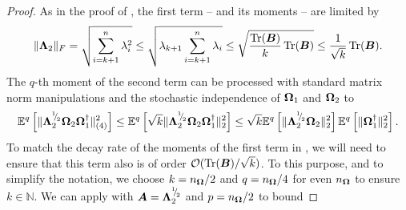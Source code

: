 \begin{proof}
    As in the proof of \cite[Lemma 3]{meyer-2021-hutch-optimal}, the first term -- and its moments -- are limited by
    \begin{equation}
        \lVert \boldsymbol{\Lambda}_2 \rVert _F
        = \sqrt{\sum_{i=k+1}^{n} \lambda_i^2}
        \leq \sqrt{ \lambda_{k+1} \sum_{i=k+1}^{n} \lambda_i}
        \leq \sqrt{ \frac{\operatorname{Tr}(\boldsymbol{B})}{k} \operatorname{Tr}(\boldsymbol{B})}
        \leq \frac{1}{\sqrt{k}} \operatorname{Tr}(\boldsymbol{B}).
        \label{equ:nystrom-proof-frobenius-trace}
    \end{equation}
    The $q$-th moment of the second term can be processed with standard matrix norm manipulations and the stochastic independence of $\boldsymbol{\Omega}_1$ and $\boldsymbol{\Omega}_2$ to
    \begin{equation}
        \mathbb{E}^{q}\left[ \lVert \mtx{\Lambda}_2^{\sfrac{1}{2}} \mtx{\Omega}_2 \mtx{\Omega}_1^{\dagger} \rVert _{(4)}^2 \right]
        \leq \mathbb{E}^{q}\left[ \sqrt{k} \lVert \mtx{\Lambda}_2^{\sfrac{1}{2}} \mtx{\Omega}_2 \mtx{\Omega}_1^{\dagger} \rVert _2^2 \right]%
        \leq \sqrt{k} \mathbb{E}^{q}\left[ \lVert \mtx{\Lambda}_2^{\sfrac{1}{2}} \mtx{\Omega}_2 \rVert _2^2\right] \mathbb{E}^{q}\left[ \lVert \mtx{\Omega}_1^{\dagger} \rVert _2^2  \right].%
        \label{equ:nystrom-proof-processed-tail}
    \end{equation}
    To match the decay rate of the moments of the first term in , we will need to ensure that this term also is of order $\mathcal{O}(\operatorname{Tr}(\boldsymbol{B}) / \sqrt{k})$. To this purpose, and to simplify the notation, we choose $k = n_{\boldsymbol{\Omega}}/2$ and $q = n_{\boldsymbol{\Omega}}/4$ for even $n_{\boldsymbol{\Omega}}$ to ensure $k \in \mathbb{N}$. We can apply  with $\boldsymbol{A} = \boldsymbol{\Lambda}_2^{{}^{1}{\mskip -5mu/\mskip -3mu}_{2}}$ and $p = n_{\boldsymbol{\Omega}}/2$ to bound

\end{proof}
